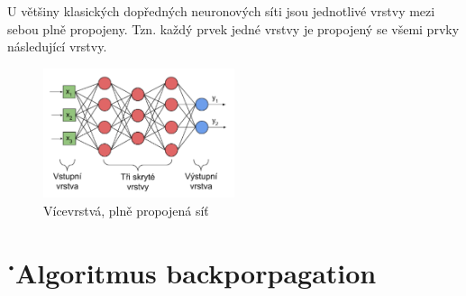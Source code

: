 U většiny klasických dopředných neuronových síti jsou jednotlivé vrstvy mezi
sebou plně propojeny. Tzn. každý prvek jedné vrstvy je propojený se všemi prvky
následující vrstvy.

\begin{figure}[]
    \centering
    \includegraphics[width=0.5\textwidth]{Figures/layers.png}
    \caption{Vícevrstvá, plně propojená síť \cite{lagan}}
    \label{fig:layers}
\end{figure}

\section{˙Algoritmus backporpagation}


\endinput